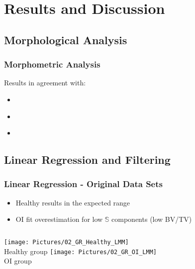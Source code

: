 \documentclass[xcolor=table,11pt]{beamer}
\begin{document}
\section{Results and Discussion}
\subsection{Morphological Analysis}
\begin{frame}
	\frametitle{Morphometric Analysis}
	\begin{table}[]
		\centering
		\caption{Summary of morphometric analysis\vspace{-1em}}
		\label{Table2}
	\end{table}\vfill
	Results in agreement with:
	\begin{itemize}
		\item \cite{p9}
		\item \cite{p10}
		\item \cite{p11}
	\end{itemize}
\end{frame}


\subsection{Linear Regression and Filtering}
\begin{frame}
	\frametitle{Linear Regression - Original Data Sets}
	\begin{itemize}
		\item Healthy results in the expected range
		\item OI fit overestimation for low $\mathbb{S}$ components (low BV/TV)
	\end{itemize}
	\begin{columns}
		\centering
		\texttt{[image: Pictures/02\_GR\_Healthy\_LMM]}\\
		Healthy group
		\centering
		\texttt{[image: Pictures/02\_GR\_OI\_LMM]}\\
		OI group
	\end{columns}	
\end{frame}
\end{document}
